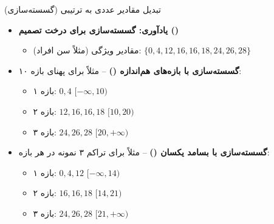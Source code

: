 \begin{frame}{تبدیل مقادیر عددی به ترتیبی (گسسته‌سازی)}
\begin{itemize}
  \item \textbf{یادآوری: گسسته‌سازی برای درخت تصمیم ()}
  \begin{itemize}
    \item مقادیر ویژگی (مثلاً سن افراد): $\{0, 4, 12, 16, 16, 18, 24, 26, 28\}$
  \end{itemize}
  \vspace{0.2cm}
  \item \textbf{گسسته‌سازی با بازه‌های هم‌اندازه ()} -- مثلاً برای پهنای بازه ۱۰:
  \begin{itemize}
    \item بازه ۱: $0, 4$ \hfill $[-\infty, 10)$
    \item بازه ۲: $12, 16, 16, 18$ \hfill $[10, 20)$
    \item بازه ۳: $24, 26, 28$ \hfill $[20, +\infty)$
  \end{itemize}
  \vspace{0.2cm}
  \item \textbf{گسسته‌سازی با بسامد یکسان ()} -- مثلاً برای تراکم ۳ نمونه در هر بازه:
  \begin{itemize}
    \item بازه ۱: $0, 4, 12$ \hfill $[-\infty, 14)$
    \item بازه ۲: $16, 16, 18$ \hfill $[14, 21)$
    \item بازه ۳: $24, 26, 28$ \hfill $[21, +\infty)$
  \end{itemize}
\end{itemize}
\end{frame}

